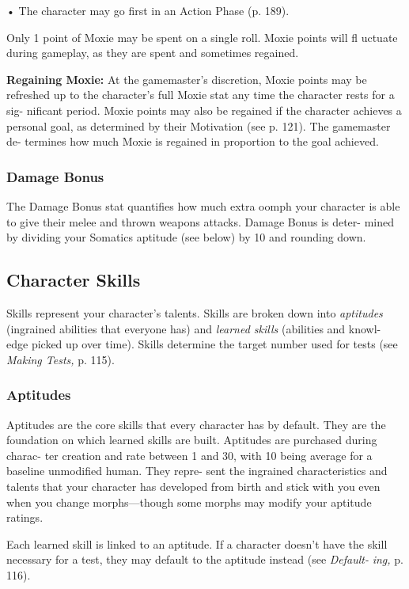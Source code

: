 •  The character may go first in an Action Phase (p. 189).

Only 1 point of Moxie may be spent on a single roll. 
Moxie points will fl uctuate during gameplay, as they 
are spent and sometimes regained.

\textbf{Regaining Moxie:} At the gamemaster's discretion, 
Moxie points may be refreshed up to the character's 
full Moxie stat any time the character rests for a sig-
nificant period. Moxie points may also be regained if 
the character achieves a personal goal, as determined 
by their Motivation (see p. 121). The gamemaster de-
termines how much Moxie is regained in proportion 
to the goal achieved.

\subsubsection{Damage Bonus}


The Damage Bonus stat quantifies how much extra 
oomph your character is able to give their melee and 
thrown weapons attacks. Damage Bonus is deter-
mined by dividing your Somatics aptitude (see below) 
by 10 and rounding down.

\subsection{Character Skills}

Skills represent your character's talents. Skills are 
broken down into \textit{aptitudes} (ingrained abilities that 
everyone has) and \textit{learned skills} (abilities and knowl-
edge picked up over time). Skills determine the target 
number used for tests (see \textit{Making Tests,} p. 115).

\subsubsection{Aptitudes}

Aptitudes are the core skills that every character has 
by default. They are the foundation on which learned 
skills are built. Aptitudes are purchased during charac-
ter creation and rate between 1 and 30, with 10 being 
average for a baseline unmodified human. They repre-
sent the ingrained characteristics and talents that your 
character has developed from birth and stick with you 
even when you change morphs—though some morphs 
may modify your aptitude ratings.

Each learned skill is linked to an aptitude. If a 
character doesn't have the skill necessary for a test, 
they may default to the aptitude instead (see \textit{Default-}
\textit{ing,} p. 116).

